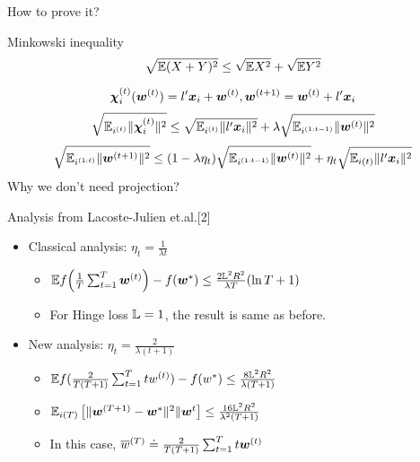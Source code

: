\begin{frame}{How to prove it?}
    \begin{block}{ Minkowski inequality}
    \[
        \sqrt{\mathbb{E}(X+Y)^2} \le \sqrt{\mathbb{E} X^2} + \sqrt{\mathbb{E} Y^2}
    \]
    \end{block}
    \[
        \bm{\chi}_i^{(t)}(\bm{w}^{(t)}) = l'\bm{x}_i + \bm{w}^{(t)}, \bm{w}^{(t+1)} = \bm{w}^{(t)}+l'\bm{x}_i
    \]
    \[
        \sqrt{\E_{i^{(t)}} \|\chiv_i^{(t)}\|^2} \le \sqrt{\E_{i^{(t)}} \| l'\xv_i \|^2} + \lambda           \sqrt{\E_{i^{(1:t-1)}} \| \wv^{(t)} \|^2} %
    \] 
    \[
        \sqrt{\mathbb{E}_{i^{(1:t)}} \|\bm{w}^{(t+1)}\|^2} \le (1-\lambda \eta_t) \sqrt{\mathbb{E}_{i^{(1:t-1)}} \|\bm{w}^{(t)}\|^2} +        \eta_t \sqrt{\mathbb{E}_{i(t)} \|l'\bm{x}_i\|^2} 
    \]
    {\color{blue} Why we don't need projection?}
\end{frame}

\begin{frame}{Analysis from Lacoste-Julien et.al.[2]}
    \begin{itemize} 
        \item Classical analysis: $\eta_t=\frac{1}{\lambda t}$
            \begin{itemize}
                \item $\mathbb{E} f\!\left(\frac1T\sum_{t=1}^T \bm{w}^{(t)} \right)- f(\bm{w}^*) \le \frac{2{\mathbb{L}}^2 R^2}{\lambda T}(\ln{T}+1)$
                \item For Hinge loss $\mathbb{L} = 1$, the result is same as before.
            \end{itemize}
        \item New analysis: $\eta_t=\frac{2}{\lambda (t+1)}$
            \begin{itemize}
                \item $\mathbb{E} f(\frac{2}{T(T+1)}\sum_{t=1}^{T}t w^{(t)}) - f(w^*) \le \frac{8{\mathbb{L}}^2 R^2}{\lambda (T+1)}$
                \item $\mathbb{E}_{i(T)} \left[  \|\bm{w}^{(T+1)} - \bm{w}^*\|^2  \|  \bm{w}^t  \right]  \le \frac{16{\mathbb{L}}^2 R^2}{\lambda^2 (T+1)}$
                \item In this case, $\overline{w}^{(T)}\doteq \frac{2}{T(T+1)}\sum_{t=1}^T t\bm{w}^{(t)}$
            \end{itemize}
    \end{itemize}
    
\end{frame}

